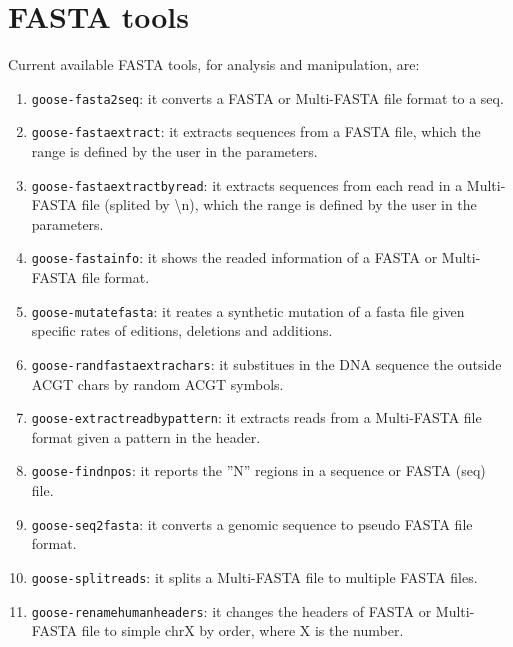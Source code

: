 \chapter{FASTA tools}
\label{fasta}

Current available FASTA tools, for analysis and manipulation, are:
\begin{enumerate}
\item \texttt{goose-fasta2seq}: it converts a FASTA or Multi-FASTA file format to a seq.
\item \texttt{goose-fastaextract}: it extracts sequences from a FASTA file, which the range is defined by the user in the parameters.
\item \texttt{goose-fastaextractbyread}: it extracts sequences from each read in a Multi-FASTA file (splited by \textbackslash n), which the range is defined by the user in the parameters.
\item \texttt{goose-fastainfo}: it shows the readed information of a FASTA or Multi-FASTA file format.
\item \texttt{goose-mutatefasta}: it reates a synthetic mutation of a fasta file given specific rates of editions, deletions and additions.
\item \texttt{goose-randfastaextrachars}: it substitues in the DNA sequence the outside ACGT chars by random ACGT symbols.
\item \texttt{goose-extractreadbypattern}: it extracts reads from a Multi-FASTA file format given a pattern in the header.
\item \texttt{goose-findnpos}: it reports the ''N'' regions in a sequence or FASTA (seq) file.
\item \texttt{goose-seq2fasta}: it converts a genomic sequence to pseudo FASTA file format.
\item \texttt{goose-splitreads}: it splits a Multi-FASTA file to multiple FASTA files.
\item \texttt{goose-renamehumanheaders}: it changes the headers of FASTA or Multi-FASTA file to simple chrX by order, where X is the number.
\end{enumerate}




 





%




